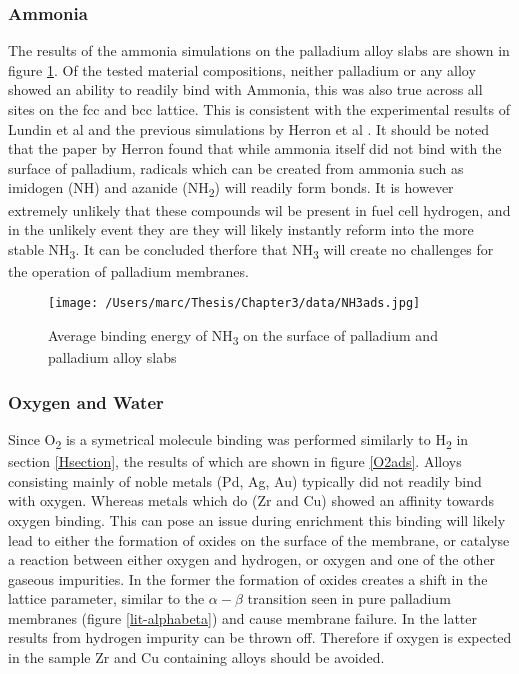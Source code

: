 \subsubsection{Ammonia}
The results of the ammonia simulations on the palladium alloy slabs are shown in figure \ref{nh3ads}. Of the tested material compositions, neither palladium or any alloy showed an ability to readily bind with Ammonia, this was also true across all sites on the fcc and bcc lattice. This is consistent with the experimental results of Lundin et al \cite{Lundin2016} and the previous simulations by Herron et al \cite{HERRON20121670}. It should be noted that the paper by Herron \cite{HERRON20121670} found that while ammonia itself did not bind with the surface of palladium, radicals which can be created from ammonia such as imidogen (NH) and azanide (NH\textsubscript{2}) will readily form bonds. It is however extremely unlikely that these compounds wil be present in fuel cell hydrogen, and in the unlikely event they are they will likely instantly reform into the more stable NH\textsubscript{3}. It can be concluded therfore that NH\textsubscript{3} will create no challenges for the operation of palladium membranes. 

  \begin{figure}
      \centering
      \texttt{[image: /Users/marc/Thesis/Chapter3/data/NH3ads.jpg]}
      \caption{Average binding energy of NH\textsubscript{3} on the surface of palladium and palladium alloy slabs}
      \label{nh3ads}
    \end{figure}
  
\subsubsection{Oxygen and Water}
Since O\textsubscript{2} is a symetrical molecule binding was performed similarly to H\textsubscript{2} in section \ref{Hsection}, the results of which are shown in figure \ref{O2ads}. Alloys consisting mainly of noble metals (Pd, Ag, Au) typically did not readily bind with oxygen. Whereas metals which do (Zr and Cu) showed an affinity towards oxygen binding. This can pose an issue during enrichment this binding will likely lead to either the formation of oxides on the surface of the membrane, or catalyse a reaction between either oxygen and hydrogen, or oxygen and one of the other gaseous impurities. In the former the formation of oxides creates a shift in the lattice parameter, similar to the $\alpha - \beta$ transition seen in pure palladium membranes (figure \ref{lit-alphabeta})\cite{Li2008b} and cause membrane failure. In the latter results from hydrogen impurity can be thrown off. Therefore if oxygen is expected in the sample Zr and Cu containing alloys should be avoided.

